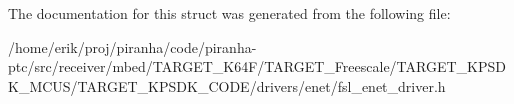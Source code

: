 The documentation for this struct was generated from the following file\+:\begin{DoxyCompactItemize}
\item 
/home/erik/proj/piranha/code/piranha-\/ptc/src/receiver/mbed/\+T\+A\+R\+G\+E\+T\+\_\+\+K64\+F/\+T\+A\+R\+G\+E\+T\+\_\+\+Freescale/\+T\+A\+R\+G\+E\+T\+\_\+\+K\+P\+S\+D\+K\+\_\+\+M\+C\+U\+S/\+T\+A\+R\+G\+E\+T\+\_\+\+K\+P\+S\+D\+K\+\_\+\+C\+O\+D\+E/drivers/enet/fsl\+\_\+enet\+\_\+driver.\+h\end{DoxyCompactItemize}
